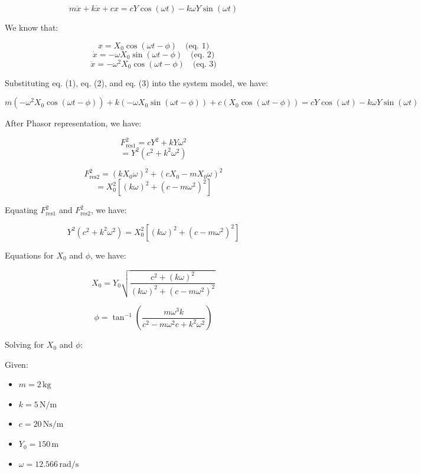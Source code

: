 \documentclass[12pt,a4paper]{article}
\begin{document}
\[
m \ddot{x} + k \dot{x} + c x = c Y \cos(\omega t) - k \omega Y \sin(\omega t)
\]

{\vspace{5pt}}

We know that:

\[
x = X_0 \cos(\omega t - \phi) \quad \text{(eq. 1)}
\]
\[
\dot{x} = -\omega X_0 \sin(\omega t - \phi) \quad \text{(eq. 2)}
\]
\[
\ddot{x} = -\omega^2 X_0 \cos(\omega t - \phi) \quad \text{(eq. 3)}
\]

{\vspace{5pt}}

Substituting eq. (1), eq. (2), and eq. (3) into the system model, we have:

\[
m (-\omega^2 X_0 \cos(\omega t - \phi)) + k (-\omega X_0 \sin(\omega t - \phi)) + c (X_0 \cos(\omega t - \phi)) = c Y \cos(\omega t) - k \omega Y \sin(\omega t)
\]

{\vspace{5pt}}

After Phasor representation, we have:

\[
F_{\text{res1}}^2 = c Y^2 + k Y \omega^2
\]
\[
= Y^2 (c^2 + k^2 \omega^2)
\]

\[
F_{\text{res2}}^2 = (k X_0 \omega)^2 + (c X_0 - m X_0 \omega)^2
\]
\[
= X_0^2 \left[ (k \omega)^2 + (c - m \omega^2)^2 \right]
\]

{\vspace{5pt}}

Equating \( F_{\text{res1}}^2 \) and \( F_{\text{res2}}^2 \), we have:

\[
Y^2 (c^2 + k^2 \omega^2) = X_0^2 \left[ (k \omega)^2 + (c - m \omega^2)^2 \right]
\]

{\vspace{5pt}}

Equations for \( X_0 \) and \( \phi \), we have:

\[
X_0 = Y_0 \sqrt{ \frac{c^2 + (k \omega)^2}{(k \omega)^2 + (c - m \omega^2)^2} }
\]

\[
\phi = \tan^{-1}\left( \frac{m \omega^3 k}{c^2 - m \omega^2 c + k^2 \omega^2} \right)
\]

{\vspace{5pt}}

Solving for \( X_0 \) and \( \phi \):

Given:
\begin{itemize}
    \item \( m = 2 \, \text{kg} \)
    \item \( k = 5 \, \text{N/m} \)
    \item \( c = 20 \, \text{Ns/m} \)
    \item \( Y_0 = 150 \, \text{m} \)
    \item \( \omega = 12.566 \, \text{rad/s} \)
\end{itemize}
\end{document}
